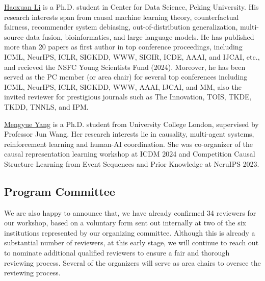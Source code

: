 \documentclass{article}
\begin{document}
\href{https://scholar.google.com/citations?user=gtDqiucAAAAJ&hl=en}{Haoxuan Li} is a Ph.D. student in Center for Data Science, Peking University. His research interests span from causal machine learning theory, counterfactual fairness, recommender system debiasing, out-of-distribution generalization, multi-source data fusion, bioinformatics, and large language models. He has published more than 20 papers as first author in top conference
proceedings, including ICML, NeurIPS, ICLR, SIGKDD, WWW, SIGIR, ICDE, AAAI, and IJCAI, etc., and recieved the NSFC Young Scientists Fund (2024). Moreover, he has been served as the PC member (or area chair) for several top conferences including ICML, NeurIPS, ICLR, SIGKDD, WWW, AAAI, IJCAI, and MM, also the invited reviewer for prestigious journals such as The Innovation, TOIS, TKDE, TKDD, TNNLS, and IPM.

\href{https://ymy4323460.github.io/}{Mengyue Yang} is a Ph.D. student from University College London, supervised by Professor Jun Wang. Her research interests lie in causality, multi-agent systems, reinforcement learning and human-AI coordination. She was co-organizer of the causal representation learning workshop at ICDM 2024 and Competition Causal Structure Learning from Event Sequences and Prior Knowledge at NeruIPS 2023.




\subsection{Program Committee}

We are also happy to announce that, we have already confirmed 34 reviewers for our workshop, based on a voluntary form sent out internally at two of the six institutions represented by our organizing committee. Although this is already a substantial number of reviewers, at this early stage, we will continue to reach out to nominate additional qualified reviewers 
to ensure a fair and thorough reviewing process.
Several of the organizers will serve as area chairs to oversee the reviewing process.

\end{document}
